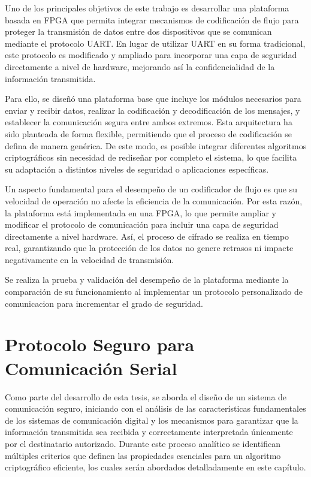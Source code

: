 Uno de los principales objetivos de este trabajo es desarrollar una plataforma basada en FPGA que permita integrar mecanismos de codificación de flujo para proteger la transmisión de datos entre dos dispositivos que se comunican mediante el protocolo UART. En lugar de utilizar UART en su forma tradicional, este protocolo es modificado y ampliado para incorporar una capa de seguridad directamente a nivel de hardware, mejorando así la confidencialidad de la información transmitida.

Para ello, se diseñó una plataforma base que incluye los módulos necesarios para enviar y recibir datos, realizar la codificación y decodificación de los mensajes, y establecer la comunicación segura entre ambos extremos. Esta arquitectura ha sido planteada de forma flexible, permitiendo que el proceso de codificación se defina de manera genérica. De este modo, es posible integrar diferentes algoritmos criptográficos sin necesidad de rediseñar por completo el sistema, lo que facilita su adaptación a distintos niveles de seguridad o aplicaciones específicas.

Un aspecto fundamental para el desempeño de un codificador de flujo es que su velocidad de operación no afecte la eficiencia de la comunicación. Por esta razón, la plataforma está implementada en una FPGA, lo que permite ampliar y modificar el protocolo de comunicación para incluir una capa de seguridad directamente a nivel hardware. Así, el proceso de cifrado se realiza en tiempo real, garantizando que la protección de los datos no genere retrasos ni impacte negativamente en la velocidad de transmisión.

Se realiza la prueba y validación del desempeño de la plataforma mediante la comparación de su funcionamiento al implementar un protocolo personalizado de comunicacion para incrementar el grado de seguridad.

\section{Protocolo Seguro para Comunicación Serial}
Como parte del desarrollo de esta tesis, se aborda el diseño de un sistema de comunicación seguro, iniciando con el análisis de las características fundamentales de los sistemas de comunicación digital y los mecanismos para garantizar que la información transmitida sea recibida y correctamente interpretada únicamente por el destinatario autorizado. Durante este proceso analítico se identifican múltiples criterios que definen las propiedades esenciales para un algoritmo criptográfico eficiente, los cuales serán abordados detalladamente en este capítulo.

